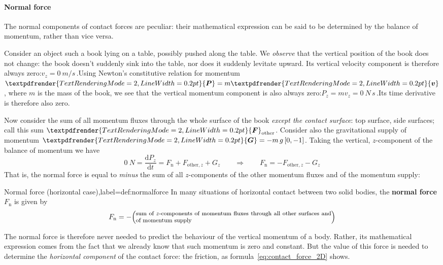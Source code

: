 \documentclass[a4paper,12pt,%
onecolumn,oneside,%
british%
]{memoir}
\renewcommand*{\bm}[1]{\textpdfrender{TextRenderingMode=2,LineWidth=0.2pt}{\boldsymbol{#1}}}
\newcommand*{\di}{\mathrm{d}}%
\renewcommand*{\|}[1][]{\nonscript\:#1\vert\nonscript\:\mathopen{}}
\newcommand*{\yv}{\bm{v}}
\newcommand*{\ym}{m}%
\newcommand*{\yP}{\bm{P}}
\newcommand*{\yF}{\bm{F}}
\newcommand*{\yFn}{F_{\text{n}}}
\newcommand*{\yFr}{\yF_{\text{other}}}
\newcommand*{\yFrz}{F_{\text{other},z}}
\newcommand*{\yG}{\bm{G}}
\begin{document}
\paragraph{Normal force}
\label{sec:normal_force}

The normal components of contact forces are peculiar: their mathematical expression can be said to be determined by the balance of momentum, rather than vice versa.

Consider an object such a book lying on a table, possibly pushed along the table. We \emph{observe} that the vertical position of the book does not change: the book doesn't suddenly sink into the table, nor does it suddenly levitate upward. Its vertical velocity component is therefore always zero:\enskip$v_{z} = \qty{0}{m/s}$\,.\enskip Using Newton's constitutive relation for momentum $\yP=\ym\yv$, where $\ym$ is the mass of the book, we see that the vertical momentum component is also always zero:\enskip$P_{z}=\ym v_{z} = \qty{0}{N\,s}$\,.\enskip Its time derivative is therefore also zero.

Now consider the sum of all momentum fluxes through the whole surface of the book \emph{except the contact surface}: top surface, side surfaces; call this sum $\yFr$. Consider also the gravitational supply of momentum $\yG=-\ym\,g\,[0,-1]$. Taking the vertical, $z$-component of the balance of momentum we have
\begin{equation*}
  \qty{0}{N} =
  \frac{\di P_{z}}{\di t}
  = \yFn + \yFrz + G_{z}
\qquad  \Longrightarrow\qquad
  \yFn = - \yFrz - G_{z}
\end{equation*}
That is, the normal force is equal to \emph{minus} the sum of all $z$-components of the other momentum fluxes and of the momentum supply:
\begin{definition}{Normal force (horizontal case),label={def:normalforce}}
  In many situations of horizontal contact between two solid bodies, the \textbf{normal force} $\yFn$ is given by
  \begin{equation*}
    \yFn = -\Bigl(\parbox{0.8\linewidth}{\footnotesize sum of $z$-components of momentum fluxes through all other surfaces and of momentum supply}\Bigr)
  \end{equation*}
\end{definition}

The normal force is therefore never needed to predict the behaviour of the vertical momentum of a body. Rather, its mathematical expression comes from the fact that we already know that such momentum is zero and constant. But the value of this force is needed to determine the \emph{horizontal component} of the contact force: the friction, as formula~\eqref{eq:contact_force_2D} shows.
\end{document}
